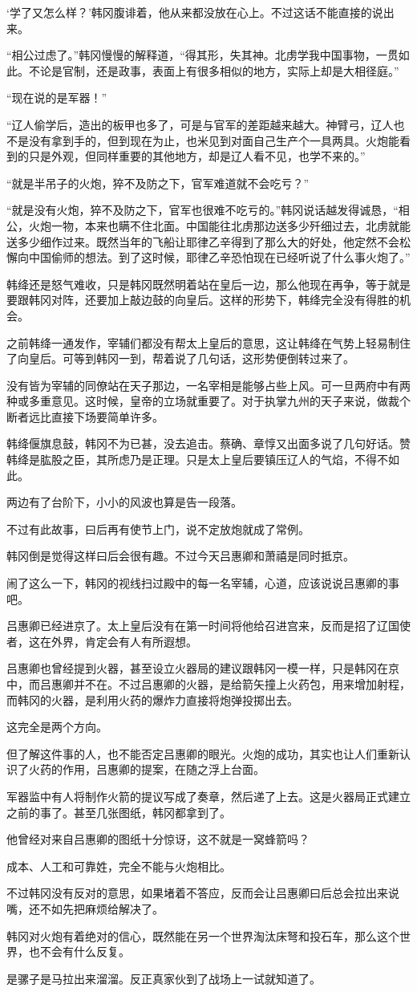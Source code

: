 ‘学了又怎么样？’韩冈腹诽着，他从来都没放在心上。不过这话不能直接的说出来。

“相公过虑了。”韩冈慢慢的解释道，“得其形，失其神。北虏学我中国事物，一贯如此。不论是官制，还是政事，表面上有很多相似的地方，实际上却是大相径庭。”

“现在说的是军器！”

“辽人偷学后，造出的板甲也多了，可是与官军的差距越来越大。神臂弓，辽人也不是没有拿到手的，但到现在为止，也米见到对面自己生产个一具两具。火炮能看到的只是外观，但同样重要的其他地方，却是辽人看不见，也学不来的。”

“就是半吊子的火炮，猝不及防之下，官军难道就不会吃亏？”

“就是没有火炮，猝不及防之下，官军也很难不吃亏的。”韩冈说话越发得诚恳，“相公，火炮一物，本来也瞒不住北面。中国能往北虏那边送多少歼细过去，北虏就能送多少细作过来。既然当年的飞船让耶律乙辛得到了那么大的好处，他定然不会松懈向中国偷师的想法。到了这时候，耶律乙辛恐怕现在已经听说了什么事火炮了。”

韩绛还是怒气难收，只是韩冈既然明着站在皇后一边，那么他现在再争，等于就是要跟韩冈对阵，还要加上敲边鼓的向皇后。这样的形势下，韩绛完全没有得胜的机会。

之前韩绛一通发作，宰辅们都没有帮太上皇后的意思，这让韩绛在气势上轻易制住了向皇后。可等到韩冈一到，帮着说了几句话，这形势便倒转过来了。

没有皆为宰辅的同僚站在天子那边，一名宰相是能够占些上风。可一旦两府中有两种或多重意见。这时候，皇帝的立场就重要了。对于执掌九州的天子来说，做裁个断者远比直接下场要简单许多。

韩绛偃旗息鼓，韩冈不为已甚，没去追击。蔡确、章惇又出面多说了几句好话。赞韩绛是肱股之臣，其所虑乃是正理。只是太上皇后要镇压辽人的气焰，不得不如此。

两边有了台阶下，小小的风波也算是告一段落。

不过有此故事，曰后再有使节上门，说不定放炮就成了常例。

韩冈倒是觉得这样曰后会很有趣。不过今天吕惠卿和萧禧是同时抵京。

闹了这么一下，韩冈的视线扫过殿中的每一名宰辅，心道，应该说说吕惠卿的事吧。

吕惠卿已经进京了。太上皇后没有在第一时间将他给召进宫来，反而是招了辽国使者，这在外界，肯定会有人有所遐想。

吕惠卿也曾经提到火器，甚至设立火器局的建议跟韩冈一模一样，只是韩冈在京中，而吕惠卿并不在。不过吕惠卿的火器，是给箭矢撞上火药包，用来增加射程，而韩冈的火器，是利用火药的爆炸力直接将炮弹投掷出去。

这完全是两个方向。

但了解这件事的人，也不能否定吕惠卿的眼光。火炮的成功，其实也让人们重新认识了火药的作用，吕惠卿的提案，在随之浮上台面。

军器监中有人将制作火箭的提议写成了奏章，然后递了上去。这是火器局正式建立之前的事了。甚至几张图纸，韩冈都拿到了。

他曾经对来自吕惠卿的图纸十分惊讶，这不就是一窝蜂箭吗？

成本、人工和可靠姓，完全不能与火炮相比。

不过韩冈没有反对的意思，如果堵着不答应，反而会让吕惠卿曰后总会拉出来说嘴，还不如先把麻烦给解决了。

韩冈对火炮有着绝对的信心，既然能在另一个世界淘汰床弩和投石车，那么这个世界，也不会有什么反复。

是骡子是马拉出来溜溜。反正真家伙到了战场上一试就知道了。
